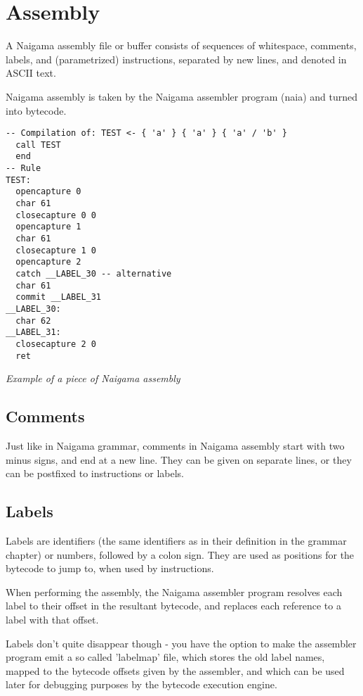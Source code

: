 \section{Assembly}
\label{sec:assembly}

A Naigama assembly file or buffer consists of sequences of
whitespace, comments, labels, and (parametrized) instructions, separated
by new lines, and denoted in ASCII text.

Naigama assembly is taken by the Naigama assembler program (naia) and turned
into bytecode.

\begin{myquote}
\begin{verbatim}
-- Compilation of: TEST <- { 'a' } { 'a' } { 'a' / 'b' }
  call TEST
  end
-- Rule
TEST:
  opencapture 0
  char 61
  closecapture 0 0
  opencapture 1
  char 61
  closecapture 1 0
  opencapture 2
  catch __LABEL_30 -- alternative
  char 61
  commit __LABEL_31
__LABEL_30:
  char 62
__LABEL_31:
  closecapture 2 0
  ret
\end{verbatim}
\end{myquote}
\textit{Example of a piece of Naigama assembly}

\subsection{Comments}

Just like in Naigama grammar,
comments in Naigama assembly start with two minus signs, and end at
a new line. They can be given on separate lines, or they can be
postfixed to instructions or labels.

\subsection{Labels}

Labels are identifiers (the same identifiers as in their definition
in the grammar chapter) or numbers, followed by a colon sign. They are used
as positions for the bytecode to jump to, when used by instructions.

When performing the assembly, the Naigama assembler program resolves
each label to their offset in the resultant bytecode, and replaces each
reference to a label with that offset.

Labels don't quite disappear though - you have the option to make the
assembler program emit a so called 'labelmap' file, which stores the old
label names, mapped to the bytecode offsets given by the assembler,
and which can be used later
for debugging purposes by the bytecode execution engine.

